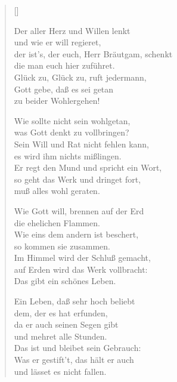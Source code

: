 \begin{multicols}{2}
\settowidth{\versewidth}{Wie Gott will, brennen auf der Erd}
\begin{verse}[\versewidth]

 Der aller Herz und Willen lenkt\\
und wie er will regieret,\\
der ist's, der euch, Herr Bräutgam, schenkt\\
die man euch hier zuführet.\\
Glück zu, Glück zu, ruft jedermann,\\
Gott gebe, daß es sei getan\\
zu beider Wohlergehen!

 Wie sollte nicht sein wohlgetan,\\
was Gott denkt zu vollbringen?\\
Sein Will und Rat nicht fehlen kann,\\
es wird ihm nichts mißlingen.\\
Er regt den Mund und spricht ein Wort,\\
so geht das Werk und dringet fort,\\
muß alles wohl geraten.

 Wie Gott will, brennen auf der Erd\\
die ehelichen Flammen.\\
Wie eins dem andern ist beschert,\\
so kommen sie zusammen.\\
Im Himmel wird der Schluß gemacht,\\
auf Erden wird das Werk vollbracht:\\
Das gibt ein schönes Leben.

 Ein Leben, daß sehr hoch beliebt\\
dem, der es hat erfunden,\\
da er auch seinen Segen gibt\\
und mehret alle Stunden.\\
Das ist und bleibet sein Gebrauch:\\
Was er gestift't, das hält er auch\\
und lässet es nicht fallen.


\end{verse}
\end{multicols}
